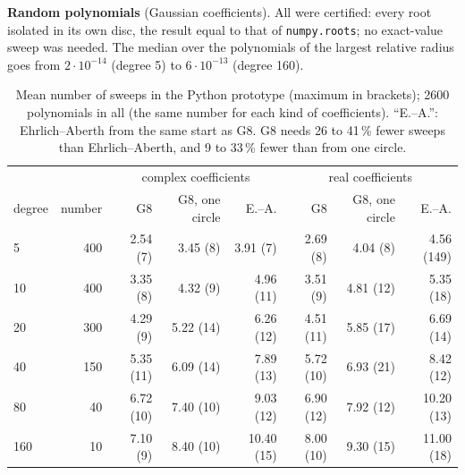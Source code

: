 \documentclass[10pt,a4paper]{article}
\theoremstyle{definition}
\numberwithin{equation}{section}
\begin{document}
\textbf{Random polynomials} (Gaussian coefficients). All were certified: every root isolated in its own
disc, the result equal to that of \texttt{numpy.roots}; no exact-value sweep was needed. The median
over the polynomials of the largest relative radius goes from $2\cdot10^{-14}$ (degree 5) to
$6\cdot10^{-13}$ (degree 160).
\begin{table}[H]\centering\small\setlength{\tabcolsep}{4.5pt}
\begin{tabular}{lr@{\quad}rrr@{\qquad}rrr}
\toprule
 & & \multicolumn{3}{c}{complex coefficients} & \multicolumn{3}{c}{real coefficients}\\
degree & number & G8 & G8, one circle & E.--A. & G8 & G8, one circle & E.--A.\\
\midrule
5 & 400 & 2.54 (7) & 3.45 (8) & 3.91 (7) & 2.69 (8) & 4.04 (8) & 4.56 (149)\\
10 & 400 & 3.35 (8) & 4.32 (9) & 4.96 (11) & 3.51 (9) & 4.81 (12) & 5.35 (18)\\
20 & 300 & 4.29 (9) & 5.22 (14) & 6.26 (12) & 4.51 (11) & 5.85 (17) & 6.69 (14)\\
40 & 150 & 5.35 (11) & 6.09 (14) & 7.89 (13) & 5.72 (10) & 6.93 (21) & 8.42 (12)\\
80 & 40 & 6.72 (10) & 7.40 (10) & 9.03 (12) & 6.90 (12) & 7.92 (12) & 10.20 (13)\\
160 & 10 & 7.10 (9) & 8.40 (10) & 10.40 (15) & 8.00 (10) & 9.30 (15) & 11.00 (18)\\
\bottomrule
\end{tabular}
\caption{Mean number of sweeps in the Python prototype (maximum in brackets); 2600 polynomials in all
(the same number for each kind of coefficients). ``E.--A.'': Ehrlich--Aberth from the same start as
G8. G8 needs 26 to 41\,\% fewer sweeps than Ehrlich--Aberth, and 9 to 33\,\% fewer than from one
circle.}\label{tab:random}
\end{table}
\end{document}
